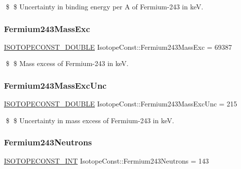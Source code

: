 \$ \$ Uncertainty in binding energy per A of Fermium-\/243 in keV. \mbox{\label{group___isotope_const-_fermium-_fm243_gab873b68eada1ec29dc6130f22d9ee880}} 
\subsubsection{\texorpdfstring{Fermium243\+Mass\+Exc}{Fermium243MassExc}}
{\footnotesize\ttfamily \mbox{\hyperlink{group___isotope_const-_macros_ga8f45a7272ce02c0b4c65c44636ed719a}{I\+S\+O\+T\+O\+P\+E\+C\+O\+N\+S\+T\+\_\+\+D\+O\+U\+B\+LE}} Isotope\+Const\+::\+Fermium243\+Mass\+Exc = 69387}

\$ \$ Mass excess of Fermium-\/243 in keV. \mbox{\label{group___isotope_const-_fermium-_fm243_gacf097cf5ad03689e703495b8b9659f31}} 
\subsubsection{\texorpdfstring{Fermium243\+Mass\+Exc\+Unc}{Fermium243MassExcUnc}}
{\footnotesize\ttfamily \mbox{\hyperlink{group___isotope_const-_macros_ga8f45a7272ce02c0b4c65c44636ed719a}{I\+S\+O\+T\+O\+P\+E\+C\+O\+N\+S\+T\+\_\+\+D\+O\+U\+B\+LE}} Isotope\+Const\+::\+Fermium243\+Mass\+Exc\+Unc = 215}

\$ \$ Uncertainty in mass excess of Fermium-\/243 in keV. \mbox{\label{group___isotope_const-_fermium-_fm243_ga0f63fc5ceb89d80da57d01a28e12c9ce}} 
\subsubsection{\texorpdfstring{Fermium243\+Neutrons}{Fermium243Neutrons}}
{\footnotesize\ttfamily \mbox{\hyperlink{group___isotope_const-_macros_ga5f18360b3e99483a35c32d789e62621c}{I\+S\+O\+T\+O\+P\+E\+C\+O\+N\+S\+T\+\_\+\+I\+NT}} Isotope\+Const\+::\+Fermium243\+Neutrons = 143}

